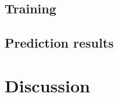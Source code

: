 \documentclass[amt, manuscript]{copernicus}
\begin{document}
\subsection{Training}

\subsection{Prediction results}

\section{Discussion}

\conclusions  %













\appendix
\section{}    %

\subsection{}     %


\noappendix       %

\end{document}
